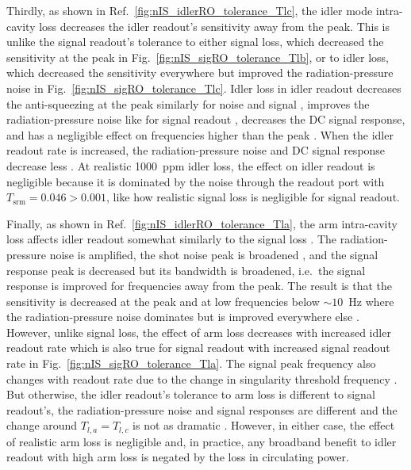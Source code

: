 Thirdly, as shown in Ref.~\ref{fig:nIS_idlerRO_tolerance_Tlc}, the idler mode intra-cavity loss decreases the idler readout's sensitivity away from the peak. This is unlike the signal readout's tolerance to either signal loss, which decreased the sensitivity at the peak in Fig.~\ref{fig:nIS_sigRO_tolerance_Tlb}, or to idler loss, which decreased the sensitivity everywhere but improved the radiation-pressure noise in Fig.~\ref{fig:nIS_sigRO_tolerance_Tlc}. Idler loss in idler readout decreases the anti-squeezing at the peak similarly for noise and signal , improves the radiation-pressure noise like for signal readout , decreases the DC signal response, and has a negligible effect on frequencies higher than the peak . When the idler readout rate is increased, the radiation-pressure noise and DC signal response decrease less . At realistic 1000~ppm idler loss, the effect on idler readout is negligible because it is dominated by the noise through the readout port with $T_\text{srm}=0.046>0.001$, like how realistic signal loss is negligible for signal readout.

Finally, as shown in Ref.~\ref{fig:nIS_idlerRO_tolerance_Tla}, the arm intra-cavity loss affects idler readout somewhat similarly to the signal loss . The radiation-pressure noise is amplified, the shot noise peak is broadened , and the signal response peak is decreased but its bandwidth is broadened, i.e.\ the signal response is improved for frequencies away from the peak. The result is that the sensitivity is decreased at the peak and at low frequencies below $\sim10$~Hz where the radiation-pressure noise dominates but is improved everywhere else . However, unlike signal loss, the effect of arm loss decreases with increased idler readout rate  which is also true for signal readout with increased signal readout rate in Fig.~\ref{fig:nIS_sigRO_tolerance_Tla}. The signal peak frequency also changes with readout rate due to the change in singularity threshold frequency . But otherwise, the idler readout's tolerance to arm loss is different to signal readout's, the radiation-pressure noise and signal responses are different and the change around $T_{l,a}=T_{l,c}$ is not as dramatic . However, in either case, the effect of realistic arm loss is negligible  and, in practice, any broadband benefit to idler readout with high arm loss is negated by the loss in circulating power. %


